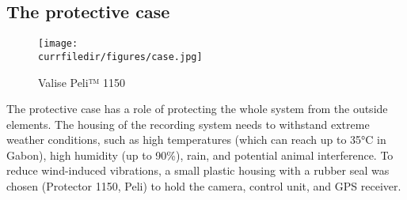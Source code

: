 \newpage
\subsection{The protective case}

\begin{figure}[!h]
    \centering
    \texttt{[image: \\currfiledir/figures/case.jpg]}
    \caption{Valise Peli™ 1150}
    \cite{case}
\end{figure}

The protective case has a role of protecting the whole system from the outside elements. The housing of the recording system needs to withstand extreme weather conditions, such as high temperatures (which can reach up to 35°C in Gabon), high humidity (up to 90\%), rain, and potential animal interference. To reduce wind-induced vibrations, a small plastic housing with a rubber seal was chosen (Protector 1150, Peli) to hold the camera, control unit, and GPS receiver.